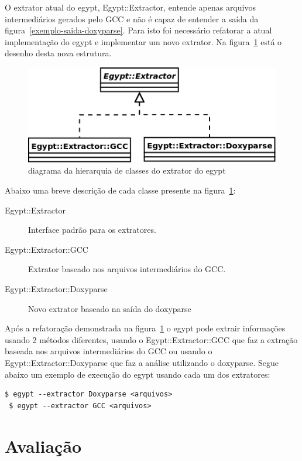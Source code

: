 O extrator atual do egypt, Egypt::Extractor, entende apenas arquivos
intermediários gerados pelo GCC e não é capaz de entender a saída da
figura~\ref{exemplo-saida-doxyparse}. Para isto foi necessário refatorar a
atual implementação do egypt e implementar um novo extrator. Na
figura~\ref{egypt-diagram-extractor} está o desenho desta nova estrutura.

\begin{figure}[h]
\center
\includegraphics[scale=0.4]{imagens/egypt-diagram-extractor}
\caption{diagrama da hierarquia de classes do extrator do egypt}
\label{egypt-diagram-extractor}
\end{figure}

Abaixo uma breve descrição de cada classe presente na
figura~\ref{egypt-diagram-extractor}:

\begin{description}
\item[Egypt::Extractor] Interface padrão para os extratores.
\item[Egypt::Extractor::GCC] Extrator baseado nos arquivos intermediários do GCC.
\item[Egypt::Extractor::Doxyparse] Novo extrator baseado na saída do doxyparse
\end{description}

Após a refatoração demonstrada na figura~\ref{egypt-diagram-extractor} o egypt
pode extrair informações usando 2 métodos diferentes, usando o
Egypt::Extractor::GCC que faz a extração baseada nos arquivos intermediários do
GCC ou usando o Egypt::Extractor::Doxyparse que faz a análise utilizando o
doxyparse. Segue abaixo um exemplo de execução do egypt usando cada um dos
extratores:

\begin{Verbatim}[frame=single,fontsize=\relsize{-2},fontfamily=courier]
 $ egypt --extractor Doxyparse <arquivos>
 $ egypt --extractor GCC <arquivos>
\end{Verbatim}

\chapter{Avaliação} \label{ch:avaliacao}

